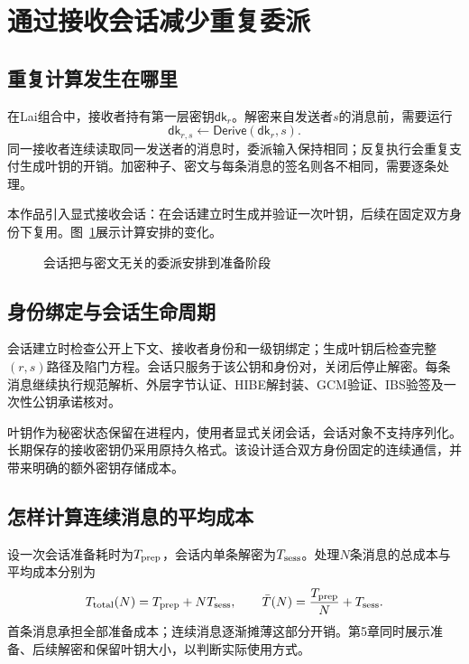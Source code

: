 \section{通过接收会话减少重复委派}
\subsection{重复计算发生在哪里}
在Lai组合中，接收者持有第一层密钥$\mathsf{dk}_r$。解密来自发送者$s$的消息前，需要运行
\[
 \mathsf{dk}_{r,s}\leftarrow\mathsf{Derive}(\mathsf{dk}_r,s).
\]
同一接收者连续读取同一发送者的消息时，委派输入保持相同；反复执行会重复支付生成叶钥的开销。加密种子、密文与每条消息的签名则各不相同，需要逐条处理。

本作品引入显式接收会话：在会话建立时生成并验证一次叶钥，后续在固定双方身份下复用。图~\ref{fig:receiver-session}展示计算安排的变化。

\begin{figure}[H]
\centering
{}
\caption{会话把与密文无关的委派安排到准备阶段}
\label{fig:receiver-session}
\end{figure}

\subsection{身份绑定与会话生命周期}
会话建立时检查公开上下文、接收者身份和一级钥绑定；生成叶钥后检查完整$(r,s)$路径及陷门方程。会话只服务于该公钥和身份对，关闭后停止解密。每条消息继续执行规范解析、外层字节认证、HIBE解封装、GCM验证、IBS验签及一次性公钥承诺核对。

叶钥作为秘密状态保留在进程内，使用者显式关闭会话，会话对象不支持序列化。长期保存的接收密钥仍采用原持久格式。该设计适合双方身份固定的连续通信，并带来明确的额外密钥存储成本。

\subsection{怎样计算连续消息的平均成本}
设一次会话准备耗时为$T_{\rm prep}$，会话内单条解密为$T_{\rm sess}$。处理$N$条消息的总成本与平均成本分别为
\[
 T_{\rm total}(N)=T_{\rm prep}+NT_{\rm sess},\qquad
 \bar T(N)=\frac{T_{\rm prep}}{N}+T_{\rm sess}.
\]
首条消息承担全部准备成本；连续消息逐渐摊薄这部分开销。第5章同时展示准备、后续解密和保留叶钥大小，以判断实际使用方式。
